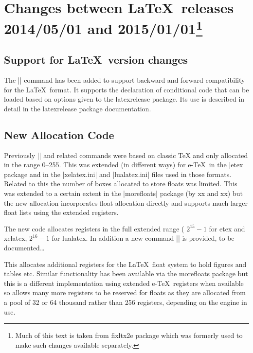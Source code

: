 \documentclass{ltxguide}
\newcommand\Lpack[1]{\textsf{#1}}
\newcommand\DescribeMacro[1]{\texttt{\string#1}}
\begin{document}
\section
[Changes between  \LaTeX\ releases 2014/05/01 and 2015/01/01]
{Changes between \LaTeX\ releases 2014/05/01 and 2015/01/01\footnote{Much of this text
is taken from \Lpack{fixltx2e} package which was formerly used to make such changes available separately.}}

\subsection{Support for \LaTeX\ version changes}
\DescribeMacro{}

\smallskip

The || command  has been added to support backward and forward compatibility for the \LaTeX\ format. It supports the declaration of conditional code that can be loaded based on options given to the \Lpack{latexrelease} package. Its use is described in detail in the
\Lpack{latexrelease} package documentation.

\subsection{New Allocation Code\label{e@alloc}}
Previously |\newcount| and related commands were based on classic
TeX and only allocated in the range 0--255. This was extended (in
different ways) for e-\TeX\ in the |etex| package and in the
|xelatex.ini| and |lualatex.ini| files used in those
formats. Related to this the number of boxes allocated to store
floats was limited. This was extended to a certain extent in the
|morefloats| package (by xx and xx) but the new allocation
incorporates float allocation directly and supports much larger
float lists using the extended registers.

The new code allocates registers in the full extended range (
$2^{15}-1$ for etex and xelatex, $2^{16}-1$ for lualatex.
In addition a new command |\extrafloats| is provided, to be documented\ldots

\DescribeMacro{\extrafloats}
\smallskip

This allocates additional registers for the \LaTeX\ float system to
hold figures and tables etc. Similar functionality has been
available via the \Lpack{morefloats} package but this is a different
implementation using extended e-\TeX\ registers when available so
allows many more registers to be reserved for floats as they are
allocated from a pool of 32 or 64 thousand rather than 256 registers,
depending on the engine in use.
\end{document}
